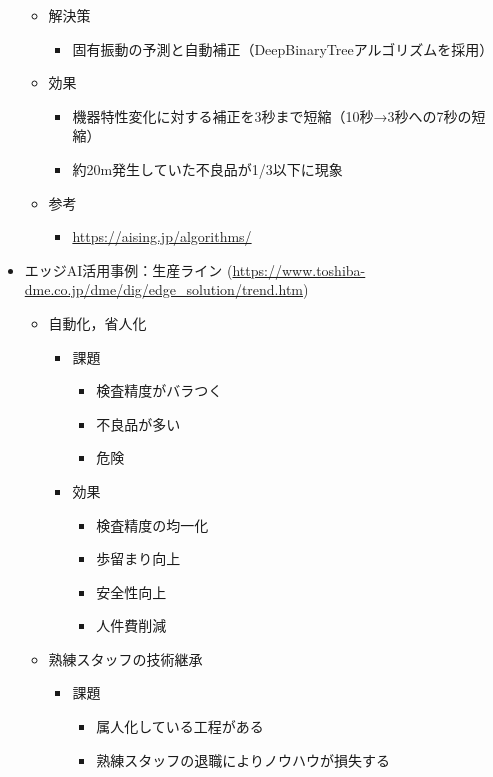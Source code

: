\begin{itemize}
\begin{itemize}
\begin{itemize}
		\end{itemize}
		\item 解決策
		\begin{itemize}
			\item 固有振動の予測と自動補正（DeepBinaryTreeアルゴリズムを採用）
		\end{itemize}
		\item 効果
		\begin{itemize}
			\item 機器特性変化に対する補正を3秒まで短縮（10秒→3秒への7秒の短縮）
			\item 約20m発生していた不良品が1/3以下に現象
		\end{itemize}
		\item 参考
		\begin{itemize}
			\item \url{https://aising.jp/algorithms/}
		\end{itemize}
	\end{itemize}
	\item エッジAI活用事例：生産ライン (\url{https://www.toshiba-dme.co.jp/dme/dig/edge_solution/trend.htm})
	\begin{itemize}
		\item 自動化，省人化
		\begin{itemize}
			\item 課題
			\begin{itemize}
				\item 検査精度がバラつく
				\item 不良品が多い
				\item 危険
			\end{itemize}
			\item 効果
			\begin{itemize}
				\item 検査精度の均一化
				\item 歩留まり向上
				\item 安全性向上
				\item 人件費削減
			\end{itemize}
		\end{itemize}
		\item 熟練スタッフの技術継承
		\begin{itemize}
			\item 課題
			\begin{itemize}
				\item 属人化している工程がある
				\item 熟練スタッフの退職によりノウハウが損失する
			\end{itemize}

\end{itemize}
\end{itemize}
\end{itemize}
